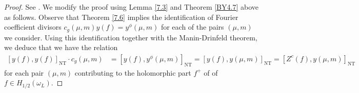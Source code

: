 \documentclass{amsart}
\theoremstyle{definition}
\theoremstyle{definition}
\theoremstyle{definition}
\begin{document}
\begin{proof} 

See \cite[Theorem 7.7]{BY}. We modify the proof using Lemma \ref{7.3} and Theorem \ref{BY4.7} above as follows. 
Observe that Theorem \ref{7.6} implies the identification of Fourier coefficient divisors 
$c_g(\mu, m) y(f) = y^{\phi}(\mu, m)$ for each of the pairs $(\mu, m)$ we consider.
Using this identification together with the Manin-Drinfeld theorem, we deduce that we have the relation
\begin{align}\label{observation} \left[ y(f), y(f) \right]_{\operatorname{NT}} \cdot c_g(\mu, m) &= \left[ y(f), y^{\phi}(\mu, m) \right]_{\operatorname{NT}}
= \left[ y(f), y(\mu, m) \right]_{\operatorname{NT}} = \left[ Z^c(f), y(\mu, m) \right]_{\operatorname{NT}} \end{align}
for each pair $(\mu, m)$ contributing to the holomorphic part $f^+$ of of $f \in H_{1/2}(\omega_L)$.


\end{proof}
\end{document}
